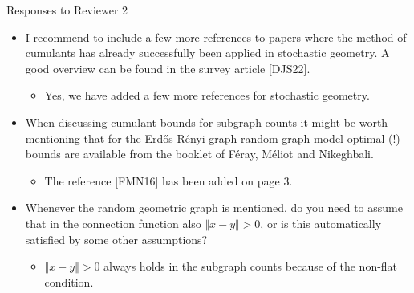 \documentclass[11pt]{article}
\let\Horig\H
\def\H{{\mathord{\mathbb H}}}
\begin{document}
\newpage

\begin{center} 
\large{Responses to Reviewer 2} %
\\ 
\end{center}

\noindent 


\begin{itemize}
  \item 
 I recommend to include a few more references to papers where the method of cumulants has already successfully been applied in stochastic geometry. A good overview can be found in the survey article [DJS22].
 \begin{itemize}
  \item Yes, we have added a few more references for stochastic geometry. 
 \end{itemize}
\item  When discussing cumulant bounds for subgraph counts it might be worth mentioning that for the Erd{\Horig o}s-R\'enyi graph random graph model optimal (!) bounds are available from the booklet of Féray, Méliot and Nikeghbali.\\
 \begin{itemize}
  \item The reference [FMN16] has been added on page 3.
   \end{itemize}

\item  Whenever the random geometric graph is mentioned, do you need to assume that in the connection function also $\Vert x - y \Vert> 0$, or is this automatically satisfied by some other assumptions?
\begin{itemize}
  \item $\Vert x - y \Vert> 0$ always holds in the subgraph counts because of the non-flat condition.
\end{itemize}


\end{itemize}
\end{document}
